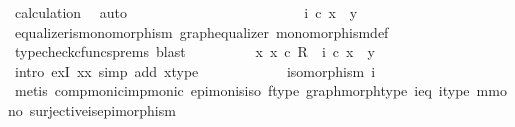 \begin{isabellebody}
\ calculation\ \isamarkupfalse%
\ auto\isanewline
\ \ \ \ \ \ \ \ \isamarkupfalse%
\isanewline
\ \ \ \ \ \ \isamarkupfalse%
\isanewline
\ \ \ \ \ \ \isamarkupfalse%
\ \isamarkupfalse%
\ {\isachardoublequoteopen}i\ {\isasymcirc}\isactrlsub c\ x{\isacharprime}{\kern0pt}\ {\isacharequal}{\kern0pt}\ y{\isacharprime}{\kern0pt}{\isachardoublequoteclose}\isanewline
\ \ \ \ \ \ \ \ \isamarkupfalse%
\ equalizer{\isacharunderscore}{\kern0pt}is{\isacharunderscore}{\kern0pt}monomorphism\ graph{\isacharunderscore}{\kern0pt}equalizer\ monomorphism{\isacharunderscore}{\kern0pt}def{}\ \isamarkupfalse%
\ {\isacharparenleft}{\kern0pt}typecheck{\isacharunderscore}{\kern0pt}cfuncs{\isacharunderscore}{\kern0pt}prems{\isacharcomma}{\kern0pt}\ blast{\isacharparenright}{\kern0pt}\isanewline
\ \ \ \ \ \ \isamarkupfalse%
\ \isamarkupfalse%
\ {\isachardoublequoteopen}{\isasymexists}x{\isacharprime}{\kern0pt}{\isachardot}{\kern0pt}\ x{\isacharprime}{\kern0pt}\ {\isasymin}\isactrlsub c\ R\ {\isasymand}\ i\ {\isasymcirc}\isactrlsub c\ x{\isacharprime}{\kern0pt}\ {\isacharequal}{\kern0pt}\ y{\isacharprime}{\kern0pt}{\isachardoublequoteclose}\isanewline
\ \ \ \ \ \ \ \ \isamarkupfalse%
\ {\isacharparenleft}{\kern0pt}intro\ exI{\isacharbrackleft}{\kern0pt}\ x{\isacharequal}{\kern0pt}x{\isacharprime}{\kern0pt}{\isacharbrackright}{\kern0pt}{\isacharcomma}{\kern0pt}\ simp\ add{\isacharcolon}{\kern0pt}\ x{\isacharprime}{\kern0pt}{\isacharunderscore}{\kern0pt}type{\isacharparenright}{\kern0pt}\isanewline
\ \ \ \ \isamarkupfalse%
\isanewline
\ \ \ \ \isamarkupfalse%
\ \isamarkupfalse%
\ {\isachardoublequoteopen}isomorphism\ i{\isachardoublequoteclose}\isanewline
\ \ \ \ \ \ \isamarkupfalse%
\ {\isacharparenleft}{\kern0pt}metis\ comp{\isacharunderscore}{\kern0pt}monic{\isacharunderscore}{\kern0pt}imp{\isacharunderscore}{\kern0pt}monic{\isacharprime}{\kern0pt}\ epi{\isacharunderscore}{\kern0pt}mon{\isacharunderscore}{\kern0pt}is{\isacharunderscore}{\kern0pt}iso\ f{\isacharunderscore}{\kern0pt}type\ graph{\isacharunderscore}{\kern0pt}morph{\isacharunderscore}{\kern0pt}type\ i{\isacharunderscore}{\kern0pt}eq\ i{\isacharunderscore}{\kern0pt}type\ m{\isacharunderscore}{\kern0pt}mono\ surjective{\isacharunderscore}{\kern0pt}is{\isacharunderscore}{\kern0pt}epimorphism{\isacharparenright}{\kern0pt}\isanewline
\ \ \ \ \isamarkupfalse%

\end{isabellebody}
